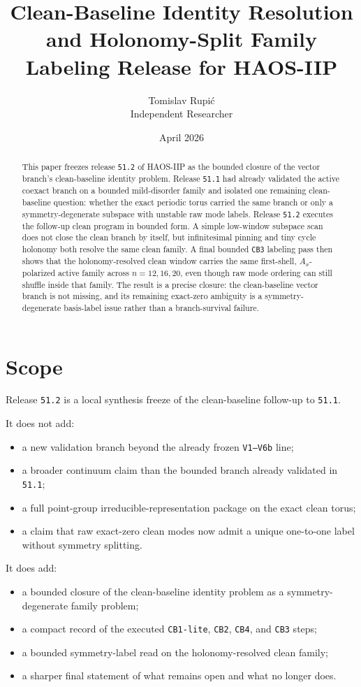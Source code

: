 \documentclass[11pt]{article}
\title{Clean-Baseline Identity Resolution and Holonomy-Split Family Labeling Release for HAOS-IIP}
\author{Tomislav Rupi\'c \\ Independent Researcher}
\date{April 2026}
\begin{document}
\maketitle

\begin{abstract}
This paper freezes release \texttt{51.2} of HAOS-IIP as the bounded closure of the vector branch's clean-baseline identity problem. Release \texttt{51.1} had already validated the active coexact branch on a bounded mild-disorder family and isolated one remaining clean-baseline question: whether the exact periodic torus carried the same branch or only a symmetry-degenerate subspace with unstable raw mode labels. Release \texttt{51.2} executes the follow-up clean program in bounded form. A simple low-window subspace scan does not close the clean branch by itself, but infinitesimal pinning and tiny cycle holonomy both resolve the same clean family. A final bounded \texttt{CB3} labeling pass then shows that the holonomy-resolved clean window carries the same first-shell, \(A_x\)-polarized active family across \(n = 12, 16, 20\), even though raw mode ordering can still shuffle inside that family. The result is a precise closure: the clean-baseline vector branch is not missing, and its remaining exact-zero ambiguity is a symmetry-degenerate basis-label issue rather than a branch-survival failure.
\end{abstract}

\tableofcontents

\section{Scope}

Release \texttt{51.2} is a local synthesis freeze of the clean-baseline follow-up to \texttt{51.1}.

It does not add:
\begin{itemize}
\item a new validation branch beyond the already frozen \texttt{V1--V6b} line;
\item a broader continuum claim than the bounded branch already validated in \texttt{51.1};
\item a full point-group irreducible-representation package on the exact clean torus;
\item a claim that raw exact-zero clean modes now admit a unique one-to-one label without symmetry splitting.
\end{itemize}

It does add:
\begin{itemize}
\item a bounded closure of the clean-baseline identity problem as a symmetry-degenerate family problem;
\item a compact record of the executed \texttt{CB1-lite}, \texttt{CB2}, \texttt{CB4}, and \texttt{CB3} steps;
\item a bounded symmetry-label read on the holonomy-resolved clean family;
\item a sharper final statement of what remains open and what no longer does.
\end{itemize}
\end{document}
